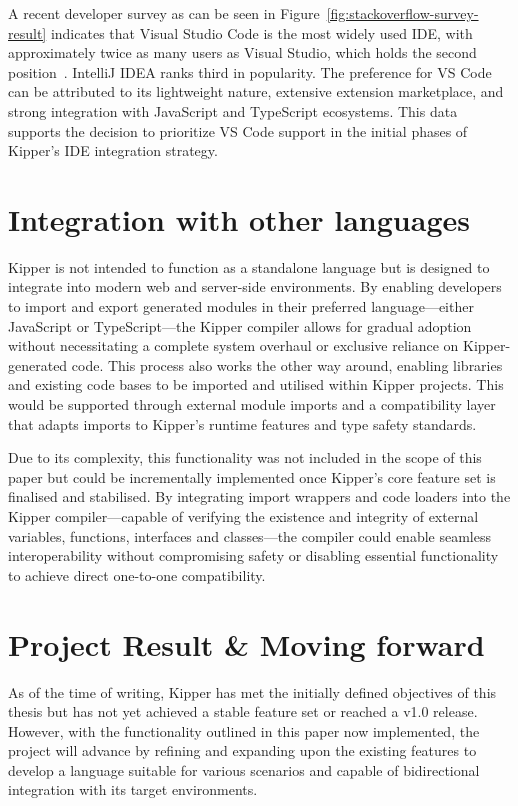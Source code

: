 A recent developer survey as can be seen in Figure~\ref{fig:stackoverflow-survey-result} indicates that Visual Studio Code is the most widely used IDE, with approximately twice as many users as Visual Studio, which holds the second position~\cite{stackoverflow2024}. IntelliJ IDEA ranks third in popularity. The preference for VS Code can be attributed to its lightweight nature, extensive extension marketplace, and strong integration with JavaScript and TypeScript ecosystems. This data supports the decision to prioritize VS Code support in the initial phases of Kipper's IDE integration strategy.

\section{Integration with other languages}

Kipper is not intended to function as a standalone language but is designed to integrate into modern web and server-side environments. By enabling developers to import and export generated modules in their preferred language—either JavaScript or TypeScript—the Kipper compiler allows for gradual adoption without necessitating a complete system overhaul or exclusive reliance on Kipper-generated code. This process also works the other way around, enabling libraries and existing code bases to be imported and utilised within Kipper projects. This would be supported through external module imports and a compatibility layer that adapts imports to Kipper's runtime features and type safety standards.

Due to its complexity, this functionality was not included in the scope of this paper but could be incrementally implemented once Kipper's core feature set is finalised and stabilised. By integrating import wrappers and code loaders into the Kipper compiler—capable of verifying the existence and integrity of external variables, functions, interfaces and classes—the compiler could enable seamless interoperability without compromising safety or disabling essential functionality to achieve direct one-to-one compatibility.

\section{Project Result \& Moving forward}

As of the time of writing, Kipper has met the initially defined objectives of this thesis but has not yet achieved a stable feature set or reached a v1.0 release. However, with the functionality outlined in this paper now implemented, the project will advance by refining and expanding upon the existing features to develop a language suitable for various scenarios and capable of bidirectional integration with its target environments.

